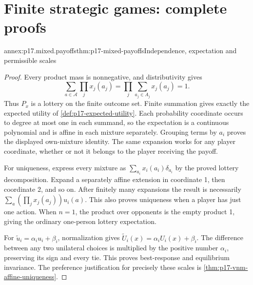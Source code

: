 \section{Finite strategic games: complete proofs}
\label{sec:annex-p17-finite-strategic-games}

\begin{annexitem}{annex:p17.mixed.payoffs}{thm:p17-mixed-payoffs}{Independence, expectation and permissible scales}
\begin{proof}
Every product mass is nonnegative, and distributivity gives
\[
       \sum_{a\in\mathcal A}\prod_jx_j(a_j)
                     =\prod_j\sum_{a_j\in A_j}x_j(a_j)=1.
\]
Thus \(P_x\) is a lottery on the finite outcome set.
Finite summation gives exactly the expected utility of
\cref{def:p17-expected-utility}. Each probability coordinate
occurs to degree at most one in each summand, so the expectation
is a continuous polynomial and is affine in each mixture
separately. Grouping terms by \(a_i\) proves the displayed
own-mixture identity. The same expansion works for any player
coordinate, whether or not it belongs to the player receiving
the payoff.

For uniqueness, express every mixture as
\(\sum_{a_i}x_i(a_i)\delta_{a_i}\) by the proved lottery
decomposition. Expand a separately affine extension in
coordinate 1, then coordinate 2, and so on. After finitely
many expansions the result is necessarily
\(\sum_a(\prod_jx_j(a_j))u_i(a)\). This also proves
uniqueness when a player has just one action.
When \(n=1\), the product over opponents is the empty
product 1, giving the ordinary one-person lottery expectation.

For \(\widetilde u_i=\alpha_i u_i+\beta_i\), normalization gives
\(\widetilde U_i(x)=\alpha_i U_i(x)+\beta_i\).
The difference between any two unilateral choices is multiplied
by the positive number \(\alpha_i\), preserving its sign
and every tie. This proves best-response and equilibrium
invariance. The preference justification for precisely these
scales is \cref{thm:p17-vnm-affine-uniqueness}.
\end{proof}
\end{annexitem}

